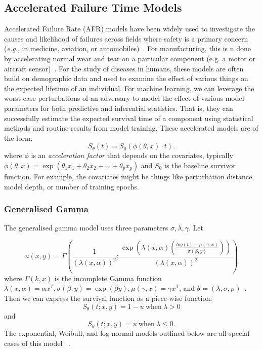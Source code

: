 \subsection{Accelerated Failure Time Models}

Accelerated Failure Rate (AFR) models have been widely used to investigate the causes and likelihood of failures across fields where safety is a primary concern (\textit{e.g.}, in medicine, aviation, or automobiles)~\cite{liu2013development,lawless1995methods}. For manufacturing, this is n done by accelerating normal wear and tear on a particular component (e.g. a motor or aircraft sensor)~\cite{liu2013development}. For the study of diseases in humans, these models are often build on demographic data and used to examine the effect of various things on the expected lifetime of an individual. For machine learning, we can leverage the worst-case perturbations of an adversary to model the effect of various model parameters for both predictive and inferential statistics. That is, they can successfully estimate the expected survival time of a component using statistical methods and routine results from model training. These accelerated models are of the form:
$$
	S_\theta(t) = S_0(\phi(\theta, x) \cdot t).
$$
where $\phi$ is an \textit{acceleration factor} that depends on the covariates, typically $\phi(\theta, x) = \exp{(\theta_1 x_1 + \theta_2 x_2 + \cdots + \theta_p x_p)}$ and $S_0$ is the baseline survivor function. For example, the covariates might be things like perturbation distance, model depth, or number of training epochs.

\subsubsection{Generalised Gamma}
The generalised gamma model uses three parameters $\sigma, \lambda,\gamma$. Let

$$
u (x,y)= \Gamma \left ( \frac{1}{(\lambda(x, \alpha))^2}; \frac{\exp \left( \lambda(x, \alpha) \left( \frac{log(t) - \mu(\gamma, x)}{\sigma(\beta, y)} \right ) \right) }{(\lambda(x, \alpha))^2} \right )
$$
where $\Gamma(k, x)$ is the incomplete Gamma function$ \lambda(x, \alpha) = \alpha x^T, \sigma(\beta, y) = \exp(\beta y ),   \mu(\gamma, x) = \gamma x^T$, and $\theta = (\lambda, \sigma, \mu) $~\cite{aft_models}. Then we can express the survival function as a piece-wise function:
$$
S_{\theta}(t; x, y) =  1 - u~\text{when}~\lambda > 0 
$$
and
$$
S_{\theta}(t; x, y) =  u~\text{when}~\lambda \leq 0 .
$$ 
The exponential, Weibull, and log-normal models outlined below are all special cases of this model ~\cite{kleinbaum1996survival}.

